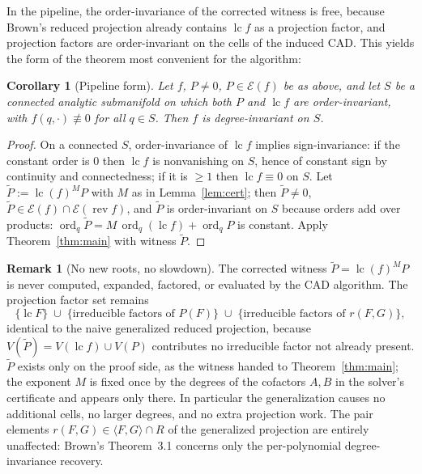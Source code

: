 \documentclass[11pt,a4paper]{article}
\newtheorem{corollary}[theorem]{Corollary}
\theoremstyle{definition}
\newtheorem{remark}[theorem]{Remark}
\newcommand{\lc}{\operatorname{lc}}
\newcommand{\rev}{\operatorname{rev}}
\newcommand{\ord}{\operatorname{ord}}
\newcommand{\E}{\mathcal{E}}
\newcommand{\ideal}[1]{\langle #1\rangle}
\begin{document}
In the pipeline, the order-invariance of the corrected witness is free,
because Brown's reduced projection already contains $\lc f$ as a projection
factor, and projection factors are order-invariant on the cells of the induced
CAD. This yields the form of the theorem most convenient for the algorithm:

\begin{corollary}[Pipeline form]\label{cor:pipeline}
Let $f$, $P \neq 0$, $P \in \E(f)$ be as above, and let $S$ be a connected
analytic submanifold on which \emph{both} $P$ \emph{and} $\lc f$ are
order-invariant, with $f(q,\cdot) \not\equiv 0$ for all $q \in S$. Then $f$ is
degree-invariant on $S$.
\end{corollary}

\begin{proof}
On a connected $S$, order-invariance of $\lc f$ implies sign-invariance: if
the constant order is $0$ then $\lc f$ is nonvanishing on $S$, hence of
constant sign by continuity and connectedness; if it is $\geq 1$ then
$\lc f \equiv 0$ on $S$. Let $\widetilde P := \lc(f)^M P$ with $M$ as in
Lemma~\ref{lem:cert}; then $\widetilde P \neq 0$, $\widetilde P \in \E(f)
\cap \E(\rev f)$, and $\widetilde P$ is order-invariant on $S$ because orders
add over products:
$\ord_q \widetilde P = M\,\ord_q(\lc f) + \ord_q P$ is constant. Apply
Theorem~\ref{thm:main} with witness $\widetilde P$.
\end{proof}

\begin{remark}[No new roots, no slowdown]\label{rem:noroots}
The corrected witness $\widetilde P = \lc(f)^M P$ is never computed, expanded,
factored, or evaluated by the CAD algorithm. The projection factor set remains
\[
  \{\lc F\} \;\cup\; \{\text{irreducible factors of } P(F)\}
            \;\cup\; \{\text{irreducible factors of } r(F,G)\},
\]
identical to the naive generalized reduced projection, because
$V(\widetilde P) = V(\lc f) \cup V(P)$ contributes no irreducible factor not
already present. $\widetilde P$ exists only on the proof side, as the witness
handed to Theorem~\ref{thm:main}; the exponent $M$ is fixed once by the
degrees of the cofactors $A, B$ in the solver's certificate and appears only
there. In particular the generalization causes no additional cells, no larger
degrees, and no extra projection work. The pair elements $r(F,G) \in
\ideal{F,G}\cap R$ of the generalized projection are entirely unaffected:
Brown's Theorem~3.1 concerns only the per-polynomial degree-invariance
recovery.
\end{remark}
\end{document}
